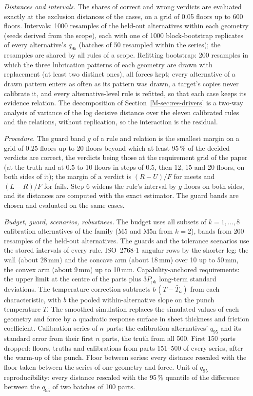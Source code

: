 \documentclass[pdflatex,sn-basic]{sn-jnl}
\begin{document}
\emph{Distances and intervals.} The shares of correct and wrong verdicts are evaluated exactly at the exclusion distances of the cases, on a grid of 0.05 floors up to 600 floors. Intervals: 1000 resamples of the held-out alternatives within each geometry (seeds derived from the scope), each with one of 1000 block-bootstrap replicates of every alternative's $q_{95}$ (batches of 50 resampled within the series); the resamples are shared by all rules of a scope. Refitting bootstrap: 200 resamples in which the three lubrication patterns of each geometry are drawn with replacement (at least two distinct ones), all forces kept; every alternative of a drawn pattern enters as often as its pattern was drawn, a target's copies never calibrate it, and every alternative-level rule is refitted, so that each case keeps its evidence relation. The decomposition of Section~\ref{M-sec:res-drivers} is a two-way analysis of variance of the log decisive distance over the eleven calibrated rules and the relations, without replication, so the interaction is the residual.

\emph{Procedure.} The guard band $g$ of a rule and relation is the smallest margin on a grid of 0.25 floors up to 20 floors beyond which at least 95\,\% of the decided verdicts are correct, the verdicts being those at the requirement grid of the paper (at the truth and at 0.5 to 10 floors in steps of 0.5, then 12, 15 and 20 floors, on both sides of it); the margin of a verdict is $(R-U)/F$ for meets and $(L-R)/F$ for fails. Step 6 widens the rule's interval by $g$ floors on both sides, and its distances are computed with the exact estimator. The guard bands are chosen and evaluated on the same cases.

\emph{Budget, guard, scenarios, robustness.} The budget uses all subsets of $k=1,\dots,8$ calibration alternatives of the family (M5 and M5n from $k=2$), bands from 200 resamples of the held-out alternatives. The guards and the tolerance scenarios use the stored intervals of every rule. ISO~2768-1 angular rows by the shorter leg: the wall (about 28\,mm) and the concave arm (about 18\,mm) over 10 up to 50\,mm, the convex arm (about 9\,mm) up to 10\,mm. Capability-anchored requirements: the upper limit at the centre of the parts plus $3P_\mathrm{pk}$ long-term standard deviations. The temperature correction subtracts $b\,(T-\bar T_a)$ from each characteristic, with $b$ the pooled within-alternative slope on the punch temperature $T$. The smoothed simulation replaces the simulated values of each geometry and force by a quadratic response surface in sheet thickness and friction coefficient. Calibration series of $n$ parts: the calibration alternatives' $q_{95}$ and its standard error from their first $n$ parts, the truth from all 500. First 150 parts dropped: floors, truths and calibrations from parts 151--500 of every series, after the warm-up of the punch. Floor between series: every distance rescaled with the floor taken between the series of one geometry and force. Unit of $q_{95}$ reproducibility: every distance rescaled with the 95\,\% quantile of the difference between the $q_{95}$ of two batches of 100 parts.
\end{document}
